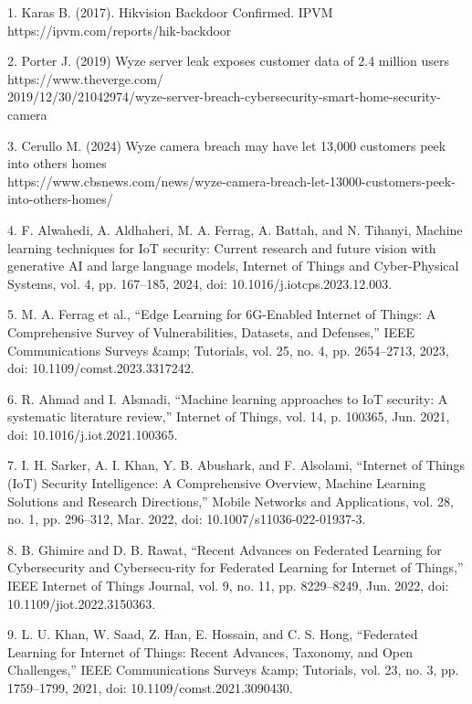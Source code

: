 \begin{noparindent}

1. Karas B. (2017). Hikvision Backdoor Confirmed. IPVM
https://ipvm.com/reports/hik-backdoor

2. Porter J. (2019) Wyze server leak exposes customer data of 2.4
million users
https://www.theverge.com/\\2019/12/30/21042974/wyze-server-breach-cybersecurity-smart-home-security-camera

3. Cerullo M. (2024) Wyze camera breach may have let 13,000 customers
peek into others\textquotesingle{} homes
\\https://www.cbsnews.com/news/wyze-camera-breach-let-13000-customers-peek-into-others-homes/

4. F. Alwahedi, A. Aldhaheri, M. A. Ferrag, A. Battah, and N. Tihanyi,
Machine learning techniques for IoT security: Current research and
future vision with generative AI and large language models, Internet of
Things and Cyber-Physical Systems, vol. 4, pp. 167--185, 2024, doi:
10.1016/j.iotcps.2023.12.003.

5. M. A. Ferrag et al., ``Edge Learning for 6G-Enabled Internet of
Things: A Comprehensive Survey of Vulnerabilities, Datasets, and
Defenses,'' IEEE Communications Surveys \&amp; Tutorials, vol. 25, no.
4, pp. 2654--2713, 2023, \\doi: 10.1109/comst.2023.3317242.

6. R. Ahmad and I. Alsmadi, ``Machine learning approaches to IoT
security: A systematic literature review,'' Internet of Things, vol. 14,
p. 100365, Jun. 2021, doi: 10.1016/j.iot.2021.100365.

7. I. H. Sarker, A. I. Khan, Y. B. Abushark, and F. Alsolami, ``Internet
of Things (IoT) Security Intelligence: A Comprehensive Overview, Machine
Learning Solutions and Research Directions,'' Mobile Networks and
Applications, vol. 28, no. 1, pp. 296--312, Mar. 2022, doi:
10.1007/s11036-022-01937-3.

8. B. Ghimire and D. B. Rawat, ``Recent Advances on Federated Learning
for Cybersecurity and Cybersecu-rity for Federated Learning for Internet
of Things,'' IEEE Internet of Things Journal, vol. 9, no. 11, pp.
8229--8249, Jun. 2022, doi: 10.1109/jiot.2022.3150363.

9. L. U. Khan, W. Saad, Z. Han, E. Hossain, and C. S. Hong, ``Federated
Learning for Internet of Things: Recent Advances, Taxonomy, and Open
Challenges,'' IEEE Communications Surveys \&amp; Tutorials, vol. 23, no.
3, pp. 1759--1799, 2021, doi: 10.1109/comst.2021.3090430.


\end{noparindent}

